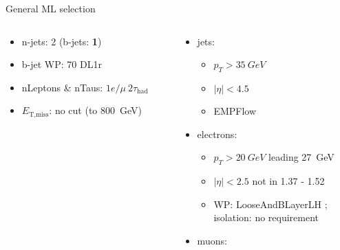 \begin{frame}{General ML selection}
  \begin{columns}
    \begin{column}{0.5\textwidth}
      \begin{itemize}
        \item n-jets: 2 (b-jets: \textbf{1})
        \item b-jet WP: 70 DL1r
        \item nLeptons \& nTaus: \bf{$1e / \mu~2\tau_{\text{had}}$}
        \item $E_{\text{T,miss}}$: no cut (to \SI{800}{GeV})
      \end{itemize}
    \end{column}
    \begin{column}{0.7\textwidth}
      \vspace*{-0.05\textwidth}
      \begin{itemize}
        \footnotesize
        \item jets:
        \vspace*{-0.02\textwidth}
        \begin{itemize}
          \footnotesize
          \item $p_T>\SI{35}{GeV}$
          \item $|\eta|<4.5$
          \item EMPFlow
        \end{itemize}
        \item electrons:
        \vspace*{-0.02\textwidth}
        \begin{itemize}
          \footnotesize
          \item $p_T>\SI{20}{GeV}$ leading \SI{27}{GeV}
          \item $|\eta|<2.5$ not in 1.37 - 1.52
          \item WP: LooseAndBLayerLH ; \\isolation: no requirement
        \end{itemize}
        \item muons:
        \vspace*{-0.02\textwidth}
        \begin{itemize}

\end{itemize}
\end{itemize}
\end{column}
\end{columns}
\end{frame}
